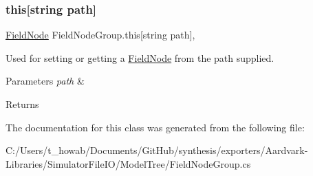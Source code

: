 \subsubsection{\texorpdfstring{this[string path]}{this[string path]}}
{\footnotesize\ttfamily \hyperlink{class_field_node}{Field\+Node} Field\+Node\+Group.\+this\mbox{[}string path\mbox{]}\hspace{0.3cm}{\ttfamily [get]}, {\ttfamily [set]}}



Used for setting or getting a \hyperlink{class_field_node}{Field\+Node} from the path supplied. 


\begin{DoxyParams}{Parameters}
{\em path} & \\
\hline
\end{DoxyParams}
\begin{DoxyReturn}{Returns}

\end{DoxyReturn}


The documentation for this class was generated from the following file\+:\begin{DoxyCompactItemize}
\item 
C\+:/\+Users/t\+\_\+howab/\+Documents/\+Git\+Hub/synthesis/exporters/\+Aardvark-\/\+Libraries/\+Simulator\+File\+I\+O/\+Model\+Tree/Field\+Node\+Group.\+cs\end{DoxyCompactItemize}
